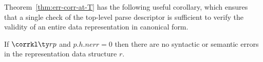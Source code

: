 Theorem~\ref{thm:err-corr-at-T} has the following useful corollary,
which ensures that a single check of the top-level parse descriptor 
is sufficient to verify the validity of an entire data 
representation in canonical form. 

\begin{corollary}
  If $\corrkl \ty r p$ and $p.h.nerr = 0$ then there are no syntactic
  or semantic errors in the representation data structure $r$.
\end{corollary}

